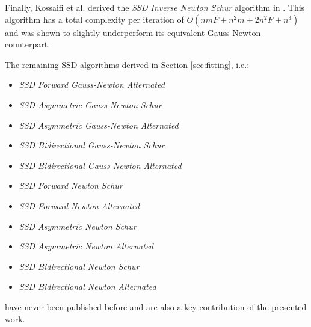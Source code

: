 Finally, Kossaifi et al. derived the \emph{SSD Inverse Newton Schur} algorithm in \cite{Kossaifi2014}. This algorithm has a total complexity per iteration of $O(nmF + n^2m + 2n^2F + n^3)$ and was shown to slightly underperform its equivalent Gauss-Newton counterpart.

The remaining SSD algorithms derived in Section \ref{sec:fitting}, i.e.:
\begin{itemize}
\item \emph{SSD Forward Gauss-Newton Alternated}
\item \emph{SSD Asymmetric Gauss-Newton Schur}
\item \emph{SSD Asymmetric Gauss-Newton Alternated}
\item \emph{SSD Bidirectional Gauss-Newton Schur}
\item \emph{SSD Bidirectional Gauss-Newton Alternated}
\item \emph{SSD Forward Newton Schur}
\item \emph{SSD Forward Newton Alternated}
\item \emph{SSD Asymmetric Newton Schur}
\item \emph{SSD Asymmetric Newton Alternated}
\item \emph{SSD Bidirectional Newton Schur}
\item \emph{SSD Bidirectional Newton Alternated}
\end{itemize}
have never been published before and are also a key contribution of the presented work.

